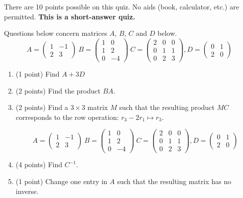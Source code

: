 \documentclass[12pt]{article}
\def\bpm{\begin{pmatrix}}
\def\epm{\end{pmatrix}}
\begin{document}

There are 10 points possible on this quiz. No aids (book, calculator, etc.)
are permitted.  {\bf This is a short-answer quiz.}

Questions below concern matrices $A$, $B$, $C$ and $D$ below.\\
$$A=\bpm 1&-1\\2&3 \epm \: B=\bpm 1&0\\1&2\\0&-4 \epm \: C=\bpm2&0&0\\0&1&1\\0&2&3 \epm, D=\bpm 0&1\\2&0\epm$$
\begin{enumerate}
\item (1 point) Find $A+3D$
\vfill

\item (2 points) Find the product $BA.$
\vfill

\item (2 points) Find a $3 \times 3$ matrix $M$ such that the resulting product $MC$ corresponds to the row operation: $r_3-2r_1 \mapsto r_3$.
\vfill

\newpage
$$A=\bpm 1&-1\\2&3 \epm \: B=\bpm 1&0\\1&2\\0&-4 \epm \: C=\bpm2&0&0\\0&1&1\\0&2&3 \epm, D=\bpm 0&1\\2&0\epm$$
\item (4 points) Find $C^{-1}$.
\vfill
\item (1 point) Change one entry in $A$ such that the resulting matrix has no inverse.
\vfill


	
\end{enumerate}	
\end{document}
